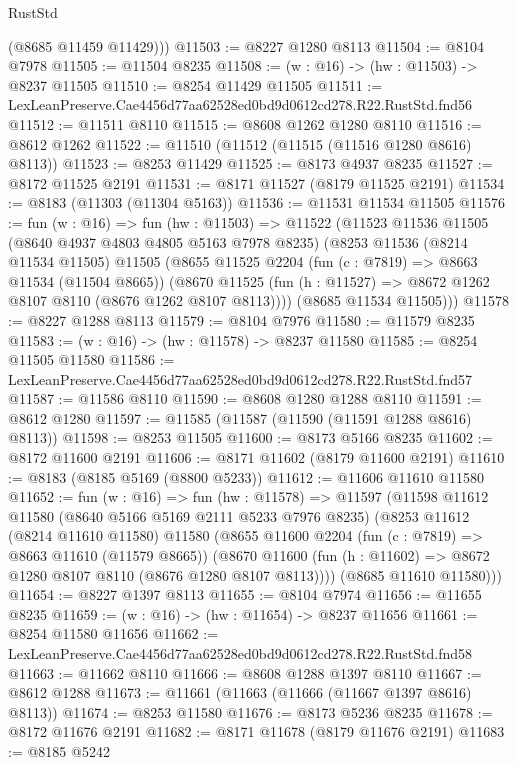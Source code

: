 \begin{lexlean}{RustStd}
\begin{coremodule}
        (@8685 @11459 @11429)))
@11503 := @8227 @1280 @8113
@11504 := @8104 @7978
@11505 := @11504 @8235
@11508 := (w : @16) -> (hw : @11503) -> @8237 @11505
@11510 := @8254 @11429 @11505
@11511 := LexLeanPreserve.Cae4456d77aa62528ed0bd9d0612cd278.R22.RustStd.fnd56
@11512 := @11511 @8110
@11515 := @8608 @1262 @1280 @8110
@11516 := @8612 @1262
@11522 := @11510 (@11512 (@11515 (@11516 @1280 @8616) @8113))
@11523 := @8253 @11429
@11525 := @8173 @4937 @8235
@11527 := @8172 @11525 @2191
@11531 := @8171 @11527 (@8179 @11525 @2191)
@11534 := @8183 (@11303 (@11304 @5163))
@11536 := @11531 @11534 @11505
@11576 := fun (w : @16) =>
  fun (hw : @11503) =>
  @11522
    (@11523
      @11536
      @11505
      (@8640 @4937 @4803 @4805 @5163 @7978 @8235)
      (@8253
        @11536
        (@8214 @11534 @11505)
        @11505
        (@8655
          @11525
          @2204
          (fun (c : @7819) => @8663 @11534 (@11504 @8665))
          (@8670 @11525 (fun (h : @11527) => @8672 @1262 @8107 @8110 (@8676 @1262 @8107 @8113))))
        (@8685 @11534 @11505)))
@11578 := @8227 @1288 @8113
@11579 := @8104 @7976
@11580 := @11579 @8235
@11583 := (w : @16) -> (hw : @11578) -> @8237 @11580
@11585 := @8254 @11505 @11580
@11586 := LexLeanPreserve.Cae4456d77aa62528ed0bd9d0612cd278.R22.RustStd.fnd57
@11587 := @11586 @8110
@11590 := @8608 @1280 @1288 @8110
@11591 := @8612 @1280
@11597 := @11585 (@11587 (@11590 (@11591 @1288 @8616) @8113))
@11598 := @8253 @11505
@11600 := @8173 @5166 @8235
@11602 := @8172 @11600 @2191
@11606 := @8171 @11602 (@8179 @11600 @2191)
@11610 := @8183 (@8185 @5169 (@8800 @5233))
@11612 := @11606 @11610 @11580
@11652 := fun (w : @16) =>
  fun (hw : @11578) =>
  @11597
    (@11598
      @11612
      @11580
      (@8640 @5166 @5169 @2111 @5233 @7976 @8235)
      (@8253
        @11612
        (@8214 @11610 @11580)
        @11580
        (@8655
          @11600
          @2204
          (fun (c : @7819) => @8663 @11610 (@11579 @8665))
          (@8670 @11600 (fun (h : @11602) => @8672 @1280 @8107 @8110 (@8676 @1280 @8107 @8113))))
        (@8685 @11610 @11580)))
@11654 := @8227 @1397 @8113
@11655 := @8104 @7974
@11656 := @11655 @8235
@11659 := (w : @16) -> (hw : @11654) -> @8237 @11656
@11661 := @8254 @11580 @11656
@11662 := LexLeanPreserve.Cae4456d77aa62528ed0bd9d0612cd278.R22.RustStd.fnd58
@11663 := @11662 @8110
@11666 := @8608 @1288 @1397 @8110
@11667 := @8612 @1288
@11673 := @11661 (@11663 (@11666 (@11667 @1397 @8616) @8113))
@11674 := @8253 @11580
@11676 := @8173 @5236 @8235
@11678 := @8172 @11676 @2191
@11682 := @8171 @11678 (@8179 @11676 @2191)
@11683 := @8185 @5242

\end{coremodule}
\end{lexlean}
